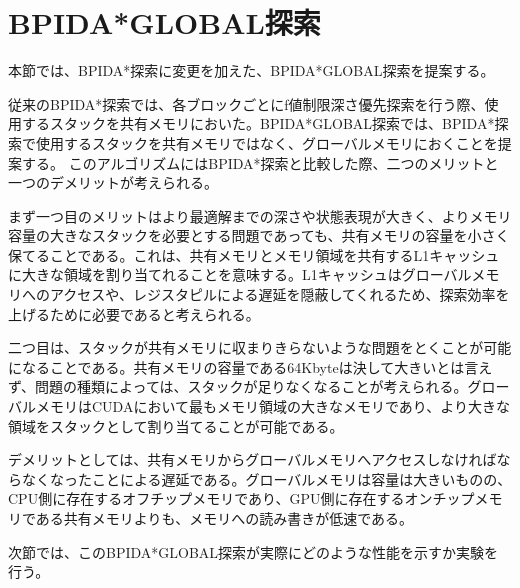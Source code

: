 \documentclass[a4paper,11pt,oneside,openany]{jsbook}
\begin{document}
\section{BPIDA*GLOBAL探索}
本節では、BPIDA*探索\cite{HA17}に変更を加えた、BPIDA*GLOBAL探索を提案する。

従来のBPIDA*探索では、各ブロックごとにf値制限深さ優先探索を行う際、使用するスタックを共有メモリにおいた。BPIDA*GLOBAL探索では、BPIDA*探索で使用するスタックを共有メモリではなく、グローバルメモリにおくことを提案する。
このアルゴリズムにはBPIDA*探索と比較した際、二つのメリットと一つのデメリットが考えられる。

まず一つ目のメリットはより最適解までの深さや状態表現が大きく、よりメモリ容量の大きなスタックを必要とする問題であっても、共有メモリの容量を小さく保てることである。これは、共有メモリとメモリ領域を共有するL1キャッシュに大きな領域を割り当てれることを意味する。L1キャッシュはグローバルメモリへのアクセスや、レジスタピルによる遅延を隠蔽してくれるため、探索効率を上げるために必要であると考えられる。

二つ目は、スタックが共有メモリに収まりきらないような問題をとくことが可能になることである。共有メモリの容量である64Kbyteは決して大きいとは言えず、問題の種類によっては、スタックが足りなくなることが考えられる。グローバルメモリはCUDAにおいて最もメモリ領域の大きなメモリであり、より大きな領域をスタックとして割り当てることが可能である。

デメリットとしては、共有メモリからグローバルメモリへアクセスしなければならなくなったことによる遅延である。グローバルメモリは容量は大きいものの、CPU側に存在するオフチップメモリであり、GPU側に存在するオンチップメモリである共有メモリよりも、メモリへの読み書きが低速である。

次節では、このBPIDA*GLOBAL探索が実際にどのような性能を示すか実験を行う。
\end{document}
